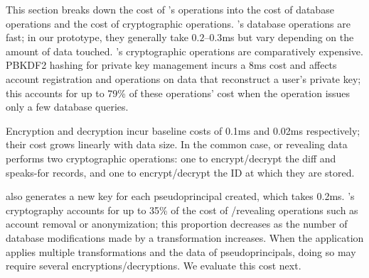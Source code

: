 This section breaks down the cost of \sys's operations into the cost of database
operations and the cost of cryptographic operations.
%
%
%
%
\sys's database operations are fast; in our prototype, they generally take
$0.2$--$0.3$ms but vary depending on the amount of data touched.
%
%
\sys's cryptographic operations are comparatively expensive.
%
PBKDF2 hashing for private key management incurs a 8ms cost and affects account
registration and operations on \xxed data that reconstruct a user's private key;
this accounts for up to 79\% of these operations' cost when the operation issues
only a few database queries.
%
%
%

Encryption and decryption incur baseline costs of 0.1ms and 0.02ms respectively;
their cost grows linearly with data size.
%
In the common case, \xxing or revealing data performs two cryptographic
operations: one to encrypt/decrypt the diff and speaks-for records, and one to
encrypt/decrypt the ID at which they are stored.
%

\sys also generates a new key for each pseudoprincipal created, which takes
0.2ms.
\sys's cryptography accounts for up to 35\%
of the cost of \xxing/revealing operations such as account removal or
anonymization; this proportion decreases as the number of database
modifications made by a transformation increases.
%
When the application applies multiple \xxing transformations and \xxs the
data of pseudoprincipals, doing so may require several encryptions/decryptions.
%
We evaluate this cost next.
%

